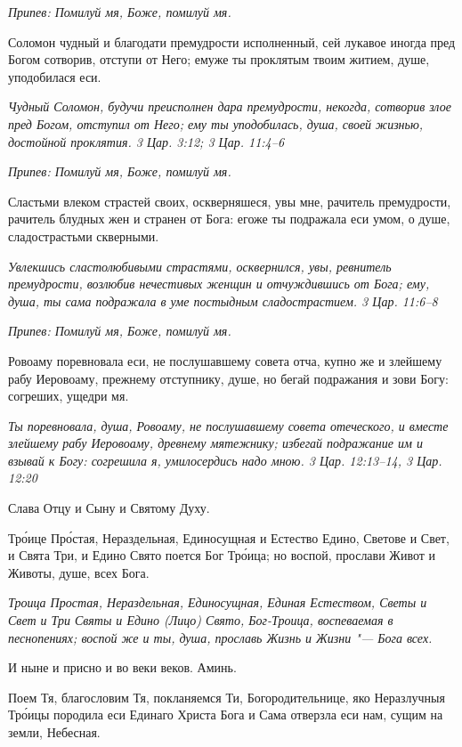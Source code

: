 \itshape Припев:\normalfont{} Помилуй мя, Боже, помилуй мя.


Соломон чудный и благодати премудрости исполненный, сей лукавое иногда пред Богом сотворив, отступи от Него; емуже ты проклятым твоим житием, душе, уподобилася еси.


\itshape Чудный Соломон, будучи преисполнен дара премудрости, некогда, сотворив злое пред Богом, отступил от Него; ему ты уподобилась, душа, своей жизнью, достойной проклятия. 3 Цар. 3:12; 3 Цар. 11:4–6\normalfont{}


\itshape Припев:\normalfont{} Помилуй мя, Боже, помилуй мя.


Сластьми влеком страстей своих, оскверняшеся, увы мне, рачитель премудрости, рачитель блудных жен и странен от Бога: егоже ты подражала еси умом, о душе, сладострастьми скверными.


\itshape Увлекшись сластолюбивыми страстями, осквернился, увы, ревнитель премудрости, возлюбив нечестивых женщин и отчуждившись от Бога; ему, душа, ты сама подражала в уме постыдным сладострастием. 3 Цар. 11:6–8\normalfont{}


\itshape Припев:\normalfont{} Помилуй мя, Боже, помилуй мя.


Ровоаму поревновала еси, не послушавшему совета отча, купно же и злейшему рабу Иеровоаму, прежнему отступнику, душе, но бегай подражания и зови Богу: согреших, ущедри мя.


\itshape Ты поревновала, душа, Ровоаму, не послушавшему совета отеческого, и вместе злейшему рабу Иеровоаму, древнему мятежнику; избегай подражание им и взывай к Богу: согрешила я, умилосердись надо мною. 3 Цар. 12:13–14, 3 Цар. 12:20\normalfont{}


Слава Отцу и Сыну и Святому Духу.


Тро́ице Про́стая, Нераздельная, Единосущная и Естество Едино, Светове и Свет, и Свята Три, и Едино Свято поется Бог Тро́ица; но воспой, прослави Живот и Животы, душе, всех Бога.


\itshape Троица Простая, Нераздельная, Единосущная, Единая Естеством, Светы и Свет и Три Святы и Едино (Лицо) Свято, Бог-Троица, воспеваемая в песнопениях; воспой же и ты, душа, прославь Жизнь и Жизни "--- Бога всех.\normalfont{}


И ныне и присно и во веки веков. Аминь.


Поем Тя, благословим Тя, покланяемся Ти, Богородительнице, яко Неразлучныя Тро́ицы породила еси Единаго Христа Бога и Сама отверзла еси нам, сущим на земли, Небесная.


